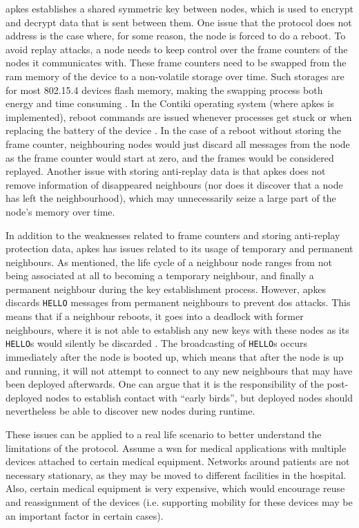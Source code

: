 \gls{apkes} establishes a shared symmetric key between nodes, which is used to encrypt and decrypt data that is sent between them. One issue that the protocol does not address is the case where, for some reason, the node is forced to do a reboot. To avoid replay attacks, a node needs to keep control over the frame counters of the nodes it communicates with. These frame counters need to be swapped from the \gls{ram} memory of the device to a non-volatile storage over time. Such storages are for most 802.15.4 devices flash memory, making the swapping process both energy and time consuming \cite{krentz2015handling}. In the Contiki operating system (where \gls{apkes} is implemented), reboot commands are issued whenever processes get stuck or when replacing the battery of the device \cite{dunkels2004contiki}. In the case of a reboot without storing the frame counter, neighbouring nodes would just discard all messages from the node as the frame counter would start at zero, and the frames would be considered replayed. Another issue with storing anti-replay data is that \gls{apkes} does not remove information of disappeared neighbours (nor does it discover that a node has left the neighbourhood), which may unnecessarily seize a large part of the node's memory over time.  

In addition to the weaknesses related to frame counters and storing anti-replay protection data, \gls{apkes} has issues related to its usage of temporary and permanent neighbours. As mentioned, the life cycle of a neighbour node ranges from not being associated at all to becoming a temporary neighbour, and finally a permanent neighbour during the key establishment process. However, \gls{apkes} discards \texttt{HELLO} messages from permanent neighbours to prevent \gls{dos} attacks. This means that if a neighbour reboots, it goes into a deadlock with former neighbours, where it is not able to establish any new keys with these nodes as its \texttt{HELLO}s would silently be discarded \cite{krentz2015handling}. The broadcasting of \texttt{HELLO}s occurs immediately after the node is booted up, which means that after the node is up and running, it will not attempt to connect to any new neighbours that may have been deployed afterwards. One can argue that it is the responsibility of the post-deployed nodes to establish contact with ``early birds'', but deployed nodes should nevertheless be able to discover new nodes during runtime. 

These issues can be applied to a real life scenario to better understand the limitations of the protocol. Assume a \gls{wsn} for medical applications with multiple devices attached to certain medical equipment. Networks around patients are not necessary stationary, as they may be moved to different facilities in the hospital. Also, certain medical equipment is very expensive, which would encourage reuse and reassignment of the devices (i.e. supporting mobility for these devices may be an important factor in certain cases). 



